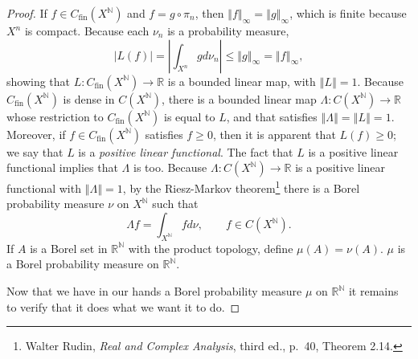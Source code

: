 \documentclass{article}
\newcommand{\norm}[1]{\left\Vert #1 \right\Vert}
\theoremstyle{definition}
\begin{document}
\begin{proof}
If $f \in C_{\mathrm{fin}}(X^\mathbb{N})$
and $f = g \circ \pi_n$, then $\norm{f}_\infty  = \norm{g}_\infty$, which is finite because $X^n$ is compact. 
Because each $\nu_n$ is a probability measure,
\[
|L(f)| =\left| \int_{X^n} gd\nu_n \right| \leq \norm{g}_\infty = \norm{f}_\infty,
\]
showing that $L:C_{\mathrm{fin}}(X^\mathbb{N}) \to \mathbb{R}$ is a bounded linear map, with $\norm{L}=1$.
Because $C_{\mathrm{fin}}(X^\mathbb{N})$ is dense in $C(X^\mathbb{N})$, 
there is a bounded linear map $\Lambda:C(X^\mathbb{N}) \to \mathbb{R}$ whose restriction to $C_{\mathrm{fin}}(X^\mathbb{N})$ is equal to $L$, and
that satisfies $\norm{\Lambda}=\norm{L}=1$.
Moreover, if $f \in C_{\mathrm{fin}}(X^\mathbb{N})$ satisfies $f \geq 0$, then it is apparent that $L(f) \geq 0$; we say that $L$ is a {\em positive linear
functional}. The fact that $L$ is a positive linear functional implies that $\Lambda$ is too. Because $\Lambda:C(X^\mathbb{N}) \to \mathbb{R}$ is a
positive linear functional with $\norm{\Lambda}=1$, by the Riesz-Markov theorem\footnote{Walter Rudin, {\em Real and 
Complex Analysis}, third ed., p.~40, Theorem 2.14.}
 there is a  Borel probability measure $\nu$ on $X^\mathbb{N}$ such that 
\[
\Lambda f = \int_{X^\mathbb{N}} f d\nu, \qquad f \in C(X^\mathbb{N}).
\]
If $A$ is a Borel set in $\mathbb{R}^\mathbb{N}$ with the product topology, define $\mu(A)=\nu(A)$.  $\mu$ is a Borel probability
measure on $\mathbb{R}^\mathbb{N}$. 

Now that we have in our hands a Borel probability measure $\mu$ on $\mathbb{R}^\mathbb{N}$ it remains to verify that it does what
we want it to do.
\end{proof}
\end{document}
